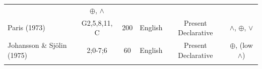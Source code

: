 \documentclass[oneside]{report}
\theoremstyle{definition}
\theoremstyle{definition}
\theoremstyle{definition}
\theoremstyle{remark}
\begin{document}
\begin{longtable}[]{@{}lcclcc@{}}
\begin{minipage}[t]{0.31\columnwidth}
\end{minipage} & \begin{minipage}[t]{0.12\columnwidth}\centering\strut
\(\oplus\), \(\land\)\strut
\end{minipage}\tabularnewline
\begin{minipage}[t]{0.17\columnwidth}\raggedright\strut
Paris (1973)\strut
\end{minipage} & \begin{minipage}[t]{0.09\columnwidth}\centering\strut
G2,5,8,11, C\strut
\end{minipage} & \begin{minipage}[t]{0.09\columnwidth}\centering\strut
200\strut
\end{minipage} & \begin{minipage}[t]{0.06\columnwidth}\raggedright\strut
English\strut
\end{minipage} & \begin{minipage}[t]{0.31\columnwidth}\centering\strut
Present Declarative\strut
\end{minipage} & \begin{minipage}[t]{0.12\columnwidth}\centering\strut
\(\land\), \(\oplus\), \(\lor\)\strut
\end{minipage}\tabularnewline
\begin{minipage}[t]{0.17\columnwidth}\raggedright\strut
Johansson \& Sjölin (1975)\strut
\end{minipage} & \begin{minipage}[t]{0.09\columnwidth}\centering\strut
2;0-7;6\strut
\end{minipage} & \begin{minipage}[t]{0.09\columnwidth}\centering\strut
60\strut
\end{minipage} & \begin{minipage}[t]{0.06\columnwidth}\raggedright\strut
English\strut
\end{minipage} & \begin{minipage}[t]{0.31\columnwidth}\centering\strut
Present Declarative\strut
\end{minipage} & \begin{minipage}[t]{0.12\columnwidth}\centering\strut
\(\oplus\), (low \(\land\))\strut
\end{minipage}\tabularnewline
\begin{minipage}[t]{0.17\columnwidth}\raggedright\strut
\strut
\end{minipage} & \begin{minipage}[t]{0.09\columnwidth}\centering\strut

\end{minipage}
\end{longtable}
\end{document}
